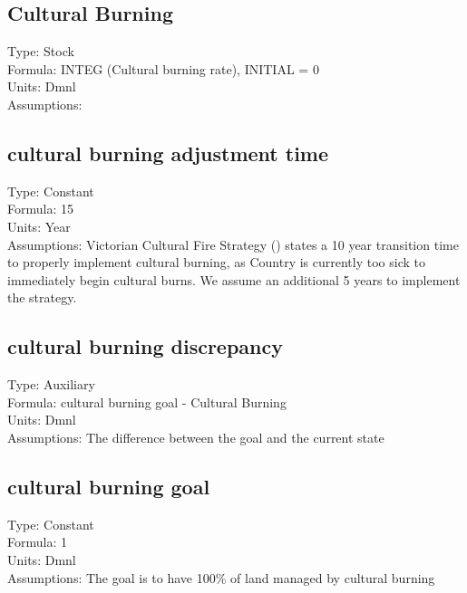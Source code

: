 \documentclass[
  11pt,
]{book}
\begin{document}
\hypertarget{cultural-burning}{%
\subsection{Cultural Burning}\label{cultural-burning}}

Type: Stock\\
Formula: INTEG (Cultural burning rate), INITIAL = 0\\
Units: Dmnl\\
Assumptions:

\hypertarget{cultural-burning-adjustment-time}{%
\subsection{cultural burning adjustment time}\label{cultural-burning-adjustment-time}}

Type: Constant\\
Formula: 15\\
Units: Year\\
Assumptions: Victorian Cultural Fire Strategy (\citet{the_victorian_traditional_owner_cultural_fire_knowledge_group_victorian_2021}) states a 10 year transition time to properly implement cultural burning, as Country is currently too sick to immediately begin cultural burns. We assume an additional 5 years to implement the strategy.

\hypertarget{cultural-burning-discrepancy}{%
\subsection{cultural burning discrepancy}\label{cultural-burning-discrepancy}}

Type: Auxiliary\\
Formula: cultural burning goal - Cultural Burning\\
Units: Dmnl\\
Assumptions: The difference between the goal and the current state

\hypertarget{cultural-burning-goal}{%
\subsection{cultural burning goal}\label{cultural-burning-goal}}

Type: Constant\\
Formula: 1\\
Units: Dmnl\\
Assumptions: The goal is to have 100\% of land managed by cultural burning
\end{document}
